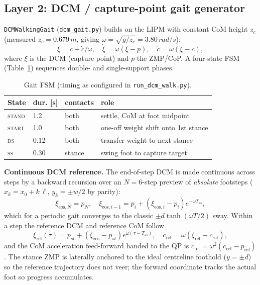 \documentclass[10pt,a4paper]{article}
\providecommand{\toprule}{\hline\hline}
\providecommand{\midrule}{\hline}
\providecommand{\bottomrule}{\hline\hline}
\newcommand{\SI}[2]{#1\,#2}          %
\newcommand{\code}[1]{\texttt{\small #1}}
\begin{document}
\subsection{Layer 2: DCM / capture-point gait generator}
\code{DCMWalkingGait} (\code{dcm\_gait.py}) builds on the LIPM with constant CoM
height $z_c$ (measured $z_c=\SI{0.679}{m}$, giving $\omega=\sqrt{g/z_c}=\SI{3.80}{rad/s}$):
\begin{equation}
\xi = c + \dot c/\omega,\quad \dot\xi=\omega(\xi-p),\quad \dot c=\omega(\xi-c),
\end{equation}
where $\xi$ is the DCM (capture point) and $p$ the ZMP/CoP. A four-state FSM
(Table~\ref{tab:fsm}) sequences double- and single-support phases.

\begin{table}[h]
\centering\small
\caption{Gait FSM (timing as configured in \code{run\_dcm\_walk.py}).}
\label{tab:fsm}
\begin{tabular}{llll}
\toprule
State & dur. [s] & contacts & role\\
\midrule
\textsc{stand} & 1.2 & both & settle, CoM at foot midpoint\\
\textsc{start} & 1.0 & both & one-off weight shift onto 1st stance\\
\textsc{ds}    & 0.12& both & transfer weight to next stance\\
\textsc{ss}    & 0.30& stance & swing foot to capture target\\
\bottomrule
\end{tabular}
\end{table}

\textbf{Continuous DCM reference.} The end-of-step DCM is made continuous across
steps by a backward recursion over an $N{=}6$-step preview of \emph{absolute}
footsteps ($x_k=x_0+k\,\ell$, $y_k=\pm w/2$ by parity):
\begin{equation}
\xi_{\text{eos},N}=p_N,\quad \xi_{\text{eos},i-1}=p_i+(\xi_{\text{eos},i}-p_i)e^{-\omega T_{ss}},
\end{equation}
which for a periodic gait converges to the classic $\pm d\tanh(\omega T/2)$ sway.
Within a step the reference DCM and reference CoM follow
\begin{equation}
\xi_{\text{ref}}(\tau)=p_{st}+(\xi_{\text{eos}}-p_{st})e^{\omega(\tau-T_{ss})},\quad
\dot c_{\text{ref}}=\omega(\xi_{\text{ref}}-c_{\text{ref}}),
\end{equation}
and the CoM acceleration feed-forward handed to the QP is
$\ddot c_{\text{ref}}=\omega^2(c_{\text{ref}}-p_{\text{ref}})$. The stance ZMP is
laterally anchored to the ideal centreline foothold ($y=\pm d$) so the reference
trajectory does not veer; the forward coordinate tracks the actual foot so
progress accumulates.
\end{document}
